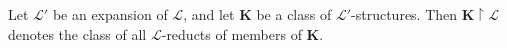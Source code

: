 Let $\mathcal{L}'$ be an expansion of $\mathcal{L}$, and let $\mathbf{K}$ be a class of $\mathcal{L}'$-structures. Then $\mathbf{K} \upharpoonright \mathcal{L}$ denotes the class of all $\mathcal{L}$-reducts of members of $\mathbf{K}$.
